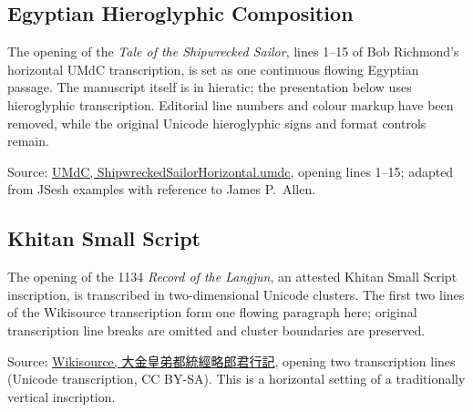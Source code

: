 \documentclass[11pt,twoside]{impeart}
\begin{document}
\subsection{Egyptian Hieroglyphic Composition}

The opening of the \emph{Tale of the Shipwrecked Sailor}, lines 1--15
of Bob Richmond's horizontal UMdC transcription, is set as one
continuous flowing Egyptian passage. The manuscript itself is in
hieratic; the presentation below uses hieroglyphic transcription.
Editorial line numbers and colour markup have been removed, while
the original Unicode hieroglyphic signs and format controls remain.

\par\medskip\noindent
{\large{}\par}
\smallskip

{\footnotesize\noindent
Source: \href{https://github.com/HieroglyphsEverywhere/UMdC/blob/master/Samples/ShipwreckedSailorHorizontal.umdc}
{UMdC, ShipwreckedSailorHorizontal.umdc}, opening lines 1--15;
adapted from JSesh examples with reference to James P.~Allen.\par}

\subsection{Khitan Small Script}

The opening of the 1134 \emph{Record of the Langjun}, an attested
Khitan Small Script inscription, is transcribed in two-dimensional
Unicode clusters. The first two lines of the Wikisource transcription
form one flowing paragraph here; original transcription line breaks
are omitted and cluster boundaries are preserved.

\par\medskip\noindent
{}\par
\smallskip

{\footnotesize\noindent
Source: \href{https://wikisource.org/w/index.php?oldid=979223}
{Wikisource, 大金皇弟都統經略郎君行記}, opening two transcription lines
(Unicode transcription, CC BY-SA). This is a horizontal setting
of a traditionally vertical inscription.\par}
\end{document}
